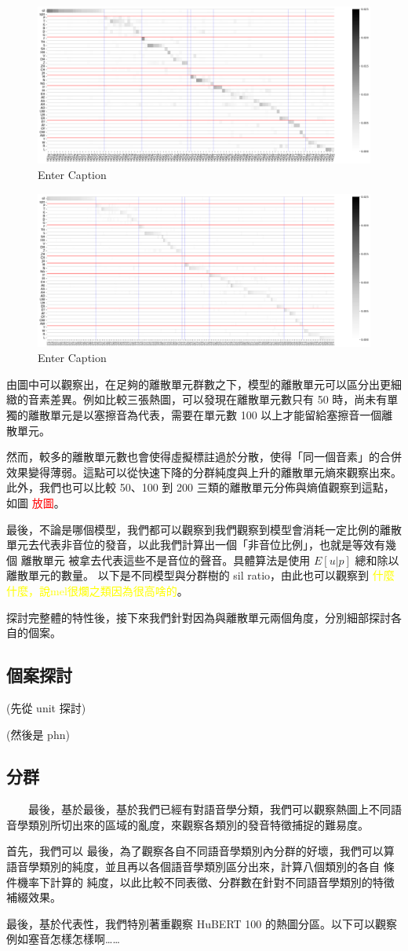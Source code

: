 \begin{figure}
    \centering
    \includegraphics[width=0.5\linewidth]{2.png}
    \caption{Enter Caption}
    \label{fig:enter-label}
\end{figure}
\begin{figure}
    \centering
    \includegraphics[width=0.5\linewidth]{image.png}
    \caption{Enter Caption}
    \label{fig:enter-label}
\end{figure}

由圖中可以觀察出，在足夠的離散單元群數之下，模型的離散單元可以區分出更細緻的音素差異。例如比較三張熱圖，可以發現在離散單元數只有 50 時，尚未有單獨的離散單元是以塞擦音為代表，需要在單元數 100 以上才能留給塞擦音一個離散單元。

然而，較多的離散單元數也會使得虛擬標註過於分散，使得「同一個音素」的合併效果變得薄弱。這點可以從快速下降的分群純度與上升的離散單元熵來觀察出來。此外，我們也可以比較 50、100 到 200 三類的離散單元分佈與熵值觀察到這點，如圖 \textcolor{red}{放圖}。

最後，不論是哪個模型，我們都可以觀察到我們觀察到模型會消耗一定比例的離散單元去代表非音位的發音，以此我們計算出一個「非音位比例」，也就是等效有幾個 離散單元 被拿去代表這些不是音位的聲音。具體算法是使用 $E [ u | p ] $  總和除以離散單元的數量。
以下是不同模型與分群樹的 sil ratio，由此也可以觀察到 \textcolor{yellow}{什麼什麼，說mel很爛之類因為很高啥的}。

探討完整體的特性後，接下來我們針對因為與離散單元兩個角度，分別細部探討各自的個案。

\subsection{個案探討}  %

(先從 unit 探討)

(然後是 phn)

\subsection{分群}

　　最後，基於最後，基於我們已經有對語音學分類，我們可以觀察熱圖上不同語音學類別所切出來的區域的亂度，來觀察各類別的發音特徵捕捉的難易度。

首先，我們可以
        最後，為了觀察各自不同語音學類別內分群的好壞，我們可以算語音學類別的純度，並且再以各個語音學類別區分出來，計算八個類別的各自 條件機率下計算的 純度，以此比較不同表徵、分群數在針對不同語音學類別的特徵補綴效果。

最後，基於代表性，我們特別著重觀察 HuBERT 100 的熱圖分區。以下可以觀察
  例如塞音怎樣怎樣啊……

